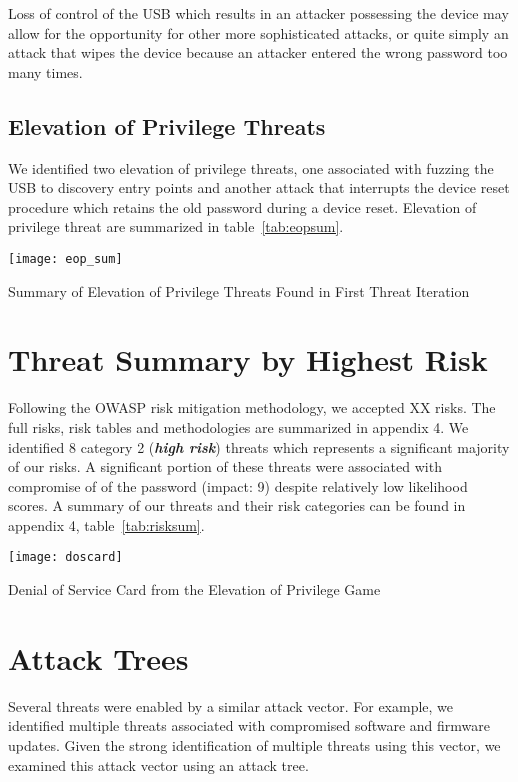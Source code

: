 Loss of control of the USB which results in an attacker possessing the device
may allow for the opportunity for other more sophisticated attacks, or quite
simply an attack that wipes the device because an attacker entered the wrong
password too many times.





\subsection{Elevation of Privilege Threats}
We identified two elevation of privilege threats, one associated with fuzzing the USB to discovery entry points and another attack that interrupts the device reset procedure which retains the old password during a device reset.  Elevation of privilege threat are summarized in table~\ref{tab:eopsum}.


\begin{table*}[ht]
    \centering
    \texttt{[image: eop\_sum]}
    \caption{Summary of Elevation of Privilege Threats Found in First Threat Iteration}
    \label{tab:eopsum}
\end{table*}



\section{Threat Summary by Highest Risk}
Following the OWASP risk mitigation methodology, we accepted XX  risks.  The full risks, risk tables and methodologies are
summarized in appendix 4. We identified 8 category 2 (\emph{\textbf{high risk}})
threats which represents a significant majority of our risks.  A significant
portion of these threats were associated with compromise of of the password
(impact: 9) despite relatively low likelihood scores.  A summary of our threats
and their risk categories can be found in appendix 4, table~\ref{tab:risksum}.

\begin{marginfigure}%
\centering
  \texttt{[image: doscard]}
  \caption{Denial of Service Card from the Elevation of Privilege Game}
  \label{fig:doscard}
\end{marginfigure}


\section{Attack Trees}
Several threats were enabled by a similar attack vector.  For example, we
identified multiple threats associated with compromised software and firmware
updates.  Given the strong identification of multiple threats using this vector,
we examined this attack vector using an attack tree.

